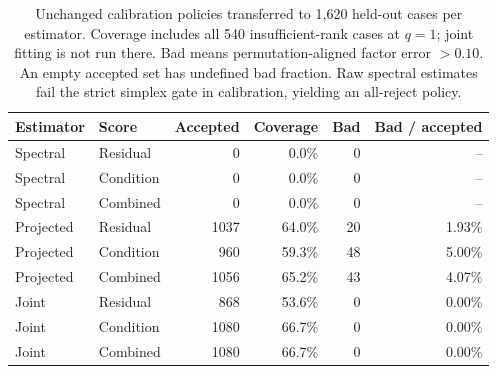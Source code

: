 \begin{table}[t]
\centering\small
\caption{Unchanged calibration policies transferred to 1,620 held-out cases per estimator. Coverage includes all 540 insufficient-rank cases at $q=1$; joint fitting is not run there. Bad means permutation-aligned factor error $>0.10$. An empty accepted set has undefined bad fraction. Raw spectral estimates fail the strict simplex gate in calibration, yielding an all-reject policy.}
\label{tab:llm-acceptance}
\begin{tabular}{llrrrr}
\toprule
Estimator & Score & Accepted & Coverage & Bad & Bad / accepted\\
\midrule
Spectral & Residual & 0 & 0.0\% & 0 & --\\
Spectral & Condition & 0 & 0.0\% & 0 & --\\
Spectral & Combined & 0 & 0.0\% & 0 & --\\
Projected & Residual & 1037 & 64.0\% & 20 & 1.93\%\\
Projected & Condition & 960 & 59.3\% & 48 & 5.00\%\\
Projected & Combined & 1056 & 65.2\% & 43 & 4.07\%\\
Joint & Residual & 868 & 53.6\% & 0 & 0.00\%\\
Joint & Condition & 1080 & 66.7\% & 0 & 0.00\%\\
Joint & Combined & 1080 & 66.7\% & 0 & 0.00\%\\
\bottomrule
\end{tabular}
\end{table}
